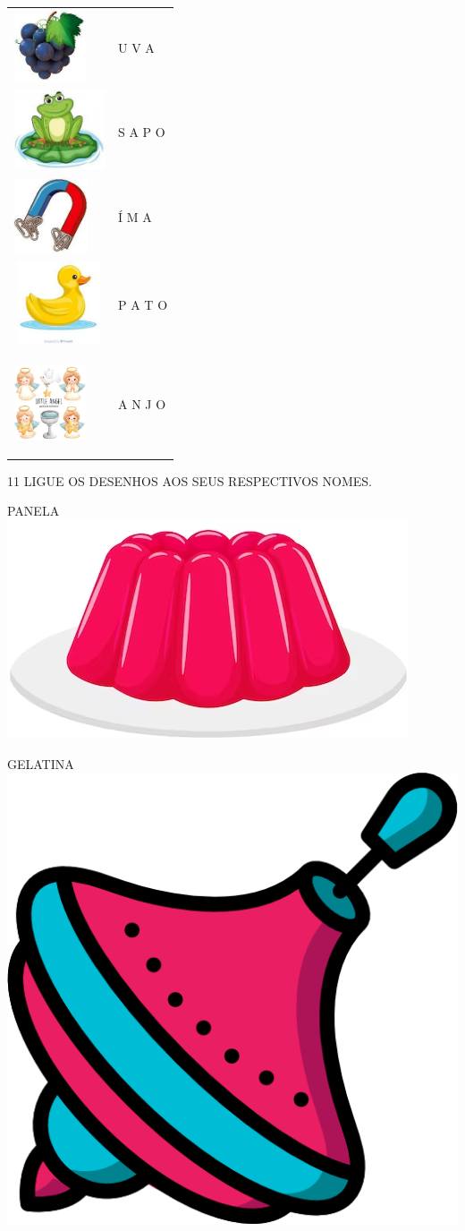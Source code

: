 \begin{tabular}{ll}
\includegraphics[width=0.83333in,height=0.84004in]{media/image38.jpg} & U V A \\
\includegraphics[width=1.06463in,height=0.91667in]{media/image39.jpg} & S A P O \\
\includegraphics[width=0.86458in,height=0.86667in]{media/image40.jpg} & Í M A \\
\includegraphics[width=1.07292in,height=0.97005in]{media/image41.jpg} & P A  T O \\
\includegraphics[width=0.85417in,height=1.14167in]{media/image42.jpg} & A N J O
\end{tabular}

\pagebreak
\num{11} LIGUE OS DESENHOS AOS SEUS RESPECTIVOS NOMES.

PANELA \hfill\includegraphics[width=.2\textwidth]{media/image43.png}

GELATINA \hfill\includegraphics[width=.15\textwidth]{media/image44.png}

